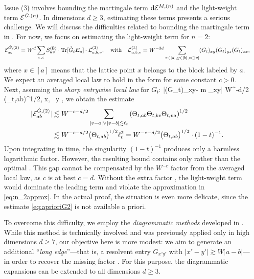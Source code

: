 Issue (3) involves bounding the martingale term \( \mathrm{d} {\mathcal E}^{M,(n)} \) and the light-weight term \( {\mathcal E}^{{\mathring G},(n)} \). In dimensions \( d \ge 3 \), estimating these terms presents a serious challenge. We will discuss the difficulties related to bounding the martingale term in . For now, we focus on estimating the light-weight term for 
 \( n=2 \): 
\[
{\mathcal E}^{{\mathring G},(2)}_{ab} = W^d \sum_{u, v} S^{({\mathsf{B}})}_{uv} \cdot \operatorname{Tr}[{\mathring G}_t E_{u}] \cdot \mathcal{L}^{(3)}_{a,b,v}, \quad\text{with}\quad 
{\mathcal L}^{(3)}_{a,b,v} = W^{-3d} \sum_{x \in [a], y \in [b], z \in [v]} (G_t)_{xy} (G_t)_{yz} (G_t)_{zx},
\]
where \( x \in [a] \) means that the lattice point \( x \) belongs to the block labeled by \( a \).  
We expect an averaged local law to hold in the form  for some constant \( c > 0 \).  
Next, assuming the \emph{sharp entrywise local law} for $G_t$: 
\be\label{eq:aprioriG2} 
|(G_t)_{xy}- m \delta_{xy}| \lesssim W^{-d/2}
\big({\Theta_{t,ab}}\big)^{1/2}, \quad \forall x\in [a], \ y \in[b],
\ee 
we obtain the estimate  
\begin{align} 
	|{\cal E}^{\Gc,(2)}_{ab}|  %
    &\lesssim W^{-c-d/2} \sum_{|v-a|\vee |v-b| \lesssim\ell_t} \p{\Theta_{t,ab} \Theta_{t,bv} \Theta_{t,va}}^{1/2} \nonumber  \\
	& \lesssim W^{-c-d/2} \big(\Theta_{t,ab}\big)^{1/2} \ell_t^2 = W^{-c-d/2} \big(\Theta_{t,ab}\big)^{1/2}\cdot (1 - t)^{-1}. 
    \label{eq:introGc}
\end{align}
Upon integrating in time, the singularity \( (1 - t)^{-1} \) produces only a harmless logarithmic factor. However, the resulting bound contains only  rather than the optimal . This gap cannot be compensated by the \( W^{-c} \) factor from the averaged local law, as \( c \) is at best \( c=d \).  
Without the extra factor , the light-weight term would dominate the leading term and violate the approximation in \eqref{eq:n=2approx}. In the actual proof, the situation is even more delicate, since the estimate \eqref{eq:aprioriG2} is not available a priori.

To overcome this difficulty, we employ the \emph{diagrammatic methods} developed in \cite{yang2021delocalization, yang2022delocalization, yang2021random}.  
While this method is technically involved and was previously applied only in high dimensions \( d \geq 7 \), our objective here is more modest: we aim to generate an additional ``\emph{long edge}''---that is, a resolvent entry \( G_{x'y'} \) with \( |x'-y'| \gtrsim W|a-b| \)---in order to recover the missing factor .  
For this purpose, the diagrammatic expansions can be extended to all dimensions \( d \geq 3 \). 

